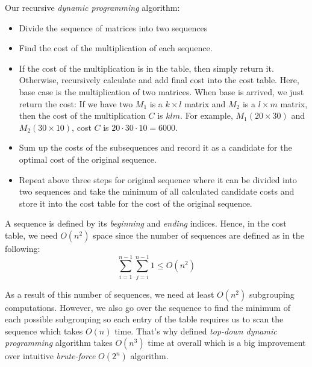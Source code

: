 Our recursive \textit{dynamic programming} algorithm:
\begin{itemize}
  \item Divide the sequence of matrices into two sequences
  \item Find the cost of the multiplication of each sequence.  
  \item If the cost of the multiplication is in the table, then simply return it. Otherwise, recursively calculate and add final cost into the cost table. Here, base case is  the multiplication of two matrices. When base is arrived, we just return the cost: If we have two $M_1$ is a $k \times l$ matrix and $M_2$ is a  $l \times m$ matrix, then the cost of the multiplication $C$ is $klm$. For example, $M_1(20 \times 30)$ and $M_2(30 \times 10)$, cost $C$ is $20 \cdot 30 \cdot 10 = 6000$.
  \item Sum up the costs of the subsequences and record it as a candidate for the optimal cost of the original sequence.
  \item Repeat above three steps for original sequence where it can be divided into two sequences and take the minimum of all calculated candidate costs and store it into the cost table for the cost of the original sequence.
\end{itemize}

A sequence is defined by its \textit{beginning} and \textit{ending} indices. Hence, in the cost table, we need $O(n^2)$ space since the number of sequences are defined as in the following:
$$
  \sum_{i=1}^{n-1}{\sum_{j=i}^{n-1} 1} \leq O(n^2)
$$

As a result of this number of sequences, we need at least $O(n^2)$ subgrouping computations. However, we also go over the sequence to find the minimum of each possible subgrouping so each entry of the table requires us to scan the sequence which takes $O(n)$ time. That's why defined \textit{top-down dynamic programming} algorithm takes $O(n^3)$ time at overall which is a big improvement over intuitive \textit{brute-force} $O(2^n)$ algorithm.